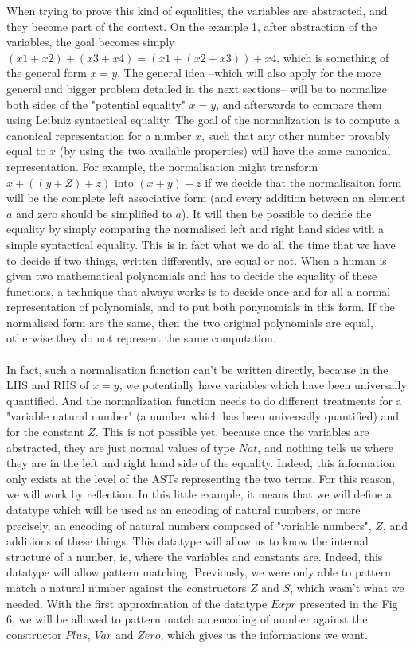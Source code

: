 When trying to prove this kind of equalities, the variables are abstracted, and they become part of the context. On the example 1, after abstraction of the variables, the goal becomes simply $(x1 + x2) + (x3 + x4) = (x1 + (x2 + x3)) + x4$, which is something of the general form $x=y$.
The general idea --which will also apply for the more general and bigger problem detailed in the next sections-- will be to normalize both sides of the "potential equality" $x=y$, and afterwards to compare them using Leibniz syntactical equality.
The goal of the normalization is to compute a canonical representation for a number $x$, such that any other number provably equal to $x$ (by using the two available properties) will have the same canonical representation. For example, the normalisation might transform $x+((y+Z)+z)$ into $(x+y)+z$ if we decide that the normalisaiton form will be the complete left associative form (and every addition between an element $a$ and zero should be simplified to $a$). It will then be possible to decide the equality by simply comparing the normalised left and right hand sides with a simple syntactical equality. This is in fact what we do all the time that we have to decide if two things, written differently, are equal or not. When a human is given two mathematical polynomials and has to decide the equality of these functions, a technique that always works is to decide once and for all a normal representation of polynomials, and to put both ponynomials in this form. If the normalised form are the same, then the two original polynomials are equal, otherwise they do not represent the same computation.\\
\\
In fact, such a normalisation function can't be written directly, because in the LHS and RHS of $x=y$, we potentially have variables which have been universally quantified. And the normalization function needs to do different treatments for a "variable natural number" (a number which has been universally quantified) and for the constant $Z$. This is not possible yet, because once the variables are abstracted, they are just normal values of type $Nat$, and nothing tells us where they are in the left and right hand side of the equality. Indeed, this information only exists at the level of the ASTs representing the two terms.
For this reason, we will work by reflection. In this little example, it means that we will define a datatype which will be used as an encoding of natural numbers, or more precisely, an encoding of natural numbers composed of "variable numbers", $Z$, and additions of these things. This datatype will allow us to know the internal structure of a number, ie, where the variables and constants are.
Indeed, this datatype will allow pattern matching. Previously, we were only able to pattern match a natural number against the constructors $Z$ and $S$, which wasn't what we needed.  With the first approximation of the datatype $Expr$ presented in the Fig 6, we will be allowed to pattern match an encoding of number against the constructor $Plus$, $Var$ and $Zero$, which gives us the informations we want.


